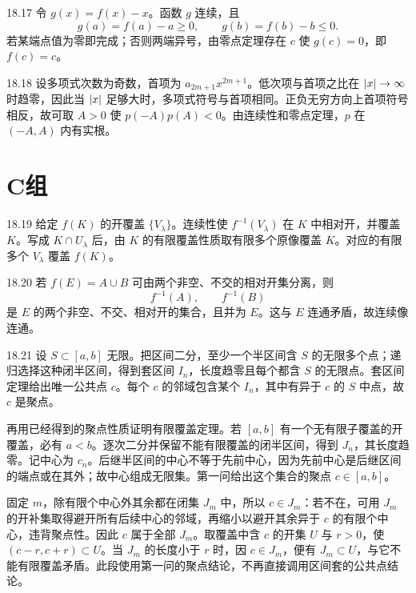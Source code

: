 \begin{solution}{18.17}
令 \(g(x)=f(x)-x\)。函数 \(g\) 连续，且
\[
 g(a)=f(a)-a\ge0,\qquad
 g(b)=f(b)-b\le0.
\]
若某端点值为零即完成；否则两端异号，由零点定理存在 \(c\) 使 \(g(c)=0\)，即 \(f(c)=c\)。
\end{solution}

\begin{solution}{18.18}
设多项式次数为奇数，首项为 \(a_{2m+1}x^{2m+1}\)。低次项与首项之比在 \(\left|x\right|\to\infty\) 时趋零，因此当 \(\left|x\right|\) 足够大时，多项式符号与首项相同。正负无穷方向上首项符号相反，故可取 \(A>0\) 使 \(p(-A)p(A)<0\)。由连续性和零点定理，\(p\) 在 \((-A,A)\) 内有实根。
\end{solution}

\section*{C组}

\begin{solution}{18.19}
给定 \(f(K)\) 的开覆盖 \(\{V_\lambda\}\)。连续性使 \(f^{-1}(V_\lambda)\) 在 \(K\) 中相对开，并覆盖 \(K\)。写成 \(K\cap U_\lambda\) 后，由 \(K\) 的有限覆盖性质取有限多个原像覆盖 \(K\)。对应的有限多个 \(V_\lambda\) 覆盖 \(f(K)\)。
\end{solution}

\begin{solution}{18.20}
若 \(f(E)=A\cup B\) 可由两个非空、不交的相对开集分离，则
\[
 f^{-1}(A),\qquad f^{-1}(B)
\]
是 \(E\) 的两个非空、不交、相对开的集合，且并为 \(E\)。这与 \(E\) 连通矛盾，故连续像连通。
\end{solution}

\begin{solution}{18.21}
设 \(S\subset[a,b]\) 无限。把区间二分，至少一个半区间含 \(S\) 的无限多个点；递归选择这种闭半区间，得到套区间 \(I_n\)，长度趋零且每个都含 \(S\) 的无限点。套区间定理给出唯一公共点 \(c\)。每个 \(c\) 的邻域包含某个 \(I_n\)，其中有异于 \(c\) 的 \(S\) 中点，故 \(c\) 是聚点。

再用已经得到的聚点性质证明有限覆盖定理。若 \([a,b]\) 有一个无有限子覆盖的开覆盖，必有 \(a<b\)。逐次二分并保留不能有限覆盖的闭半区间，得到 \(J_n\)，其长度趋零。记中心为 \(c_n\)。后继半区间的中心不等于先前中心，因为先前中心是后继区间的端点或在其外；故中心组成无限集。第一问给出这个集合的聚点 \(c\in[a,b]\)。

固定 \(m\)，除有限个中心外其余都在闭集 \(J_m\) 中，所以 \(c\in J_m\)：若不在，可用 \(J_m\) 的开补集取得避开所有后续中心的邻域，再缩小以避开其余异于 \(c\) 的有限个中心，违背聚点性。因此 \(c\) 属于全部 \(J_m\)。取覆盖中含 \(c\) 的开集 \(U\) 与 \(r>0\)，使 \((c-r,c+r)\subset U\)。当 \(J_m\) 的长度小于 \(r\) 时，因 \(c\in J_m\)，便有 \(J_m\subset U\)，与它不能有限覆盖矛盾。此段使用第一问的聚点结论，不再直接调用区间套的公共点结论。
\end{solution}

